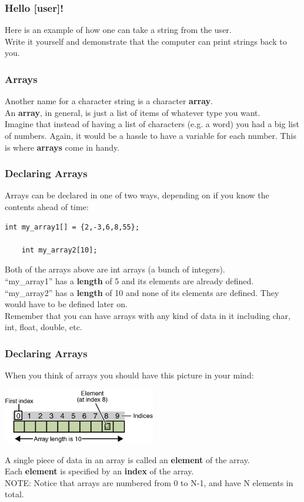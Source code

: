 \documentclass{beamer}
\begin{document}
\begin{frame}[fragile]
  \frametitle{Hello [user]!}
  Here is an example of how one can take a string from the user.\\
  Write it yourself and demonstrate that the computer can print strings back to you.
  
\end{frame}

\begin{frame}
  \frametitle{Arrays}
  Another name for a character string is a character \textbf{array}.\\
  An \textbf{array}, in general, is just a list of items of whatever type you want.\\
  Imagine that instead of having a list of characters (e.g. a word) you had a big list
  of numbers. Again, it would be a hassle to have a variable for each number. This is where
  \textbf{arrays} come in handy.
\end{frame}

\begin{frame}[fragile]
  \frametitle{Declaring Arrays}
  Arrays can be declared in one of two ways, depending on if you know the contents ahead of time:
  \begin{lstlisting}[style=customc]
    int my_array1[] = {2,-3,6,8,55};

    int my_array2[10];
  \end{lstlisting}
  Both of the arrays above are int arrays (a bunch of integers).\\
  ``my\_array1'' has a \textbf{length} of 5 and its elements are already defined.\\
  ``my\_array2'' has a \textbf{length} of 10 and none of its elements are defined. 
  They would have to be defined later on.\\
  Remember that you can have arrays with any kind of data in it including char, int, float, double, etc.
\end{frame}

\begin{frame}[fragile]
  \frametitle{Declaring Arrays}
  When you think of arrays you should have this picture in your mind:
  \begin{center}
    \includegraphics[width=0.5\textwidth]{array_pic.png}
  \end{center}
  A single piece of data in an array is called an \textbf{element} of the array.\\
  Each \textbf{element} is specified by an \textbf{index} of the array.\\
  \vspace{12pt}
  NOTE: Notice that arrays are numbered from 0 to N-1, and have N elements in total.
\end{frame}
\end{document}
